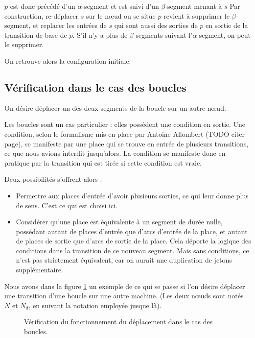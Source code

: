 $p$ est donc précédé d'un $\alpha$-segment et est suivi d'un $\beta$-segment menant à $s$
Par construction, re-déplacer $s$ sur le nœud ou se situe $p$ revient à supprimer le $\beta$-segment, et replacer les entrées de $s$ qui sont aussi des sorties de $p$ en sortie de la transition de base de $p$. S'il n'y a plus de $\beta$-segments suivant l'$\alpha$-segment, on peut le supprimer.

On retrouve alors la configuration initiale.

\subsection{Vérification dans le cas des boucles}
On désire déplacer un des deux segments de la boucle sur un autre nœud.

Les boucles sont un cas particulier : elles possèdent une condition en sortie.
Une condition, selon le formalisme mis en place par Antoine Allombert (TODO citer page), se manifeste par une place qui se trouve en entrée de plusieurs transitions, ce que nous avions interdit jusqu'alors. La condition se manifeste donc en pratique par la transition qui est tirée si cette condition est vraie.

Deux possibilités s'offrent alors : 
\begin{itemize}
\item Permettre aux places d'entrée d'avoir plusieurs sorties, ce qui leur donne plus de sens. C'est ce qui est choisi ici.
\item Considérer qu'une place est équivalente à un segment de durée nulle, possédant autant de places d'entrée que d'arcs d'entrée de la place, et autant de places de sortie que d'arcs de sortie de la place. Cela déporte la logique des conditions dans la transition de ce nouveau segment. Mais sans conditions, ce n'est pas strictement équivalent, car on aurait une duplication de jetons supplémentaire.
\end{itemize}

Nous avons dans la figure \ref{fig:verifBoucles} un exemple de ce qui se passe si l'on désire déplacer une transition d'une boucle sur une autre machine. (Les deux nœuds sont notés $N$ et $N_d$, en suivant la notation employée jusque là).

\begin{figure}[H]
\centering

\caption{Vérification du fonctionnement du déplacement dans le cas des boucles.}
\label{fig:verifBoucles}
\end{figure}


